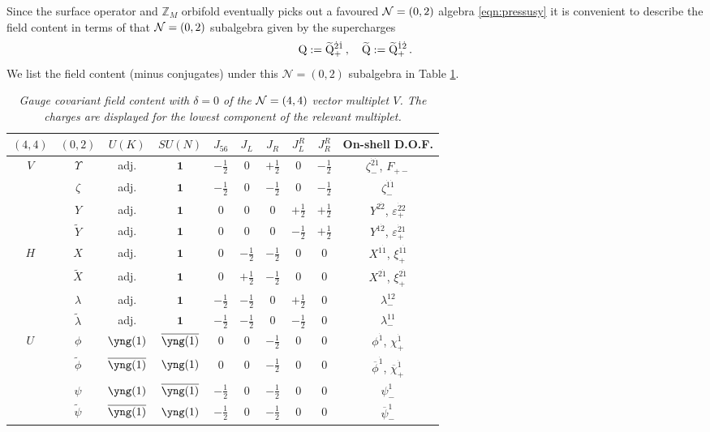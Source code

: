\documentclass[main.tex]{subfiles}
\begin{document}
Since the surface operator and $\mathbb{Z}_M$ orbifold eventually picks out a favoured $\mathcal{N}=(0,2)$ algebra \eqref{eqn:pressusy} it is convenient to describe the field content in terms of that $\mathcal{N}=(0,2)$ subalgebra given by the supercharges 
\begin{equation}\label{eqn:20algebra}
\mathrm{Q}:=\widetilde{\mathrm{Q}}^{\dot2\dot1}_{+}\,,\quad\widetilde{\mathrm{Q}}:=\widetilde{\mathrm{Q}}^{\dot1\dot2}_{+}\,.
\end{equation}
We list the field content (minus conjugates) under this $\mathcal{N}=(0,2)$ subalgebra in Table \ref{tab:d1d5}.
\begin{table}
\centering
 \begin{tabular}{|c|c|c|c|c|c|c|c|c|c|} 
 \hline
$(4,4)$ & $(0,2)$ & $U(K)$ & $SU(N)$& $J_{56}$&$J_L$&$J_R$&$J_L^R$&$J_R^R$ &On-shell D.O.F.\\\hline\hline
\multirow{ 4}{*}{$V$}&$\Upsilon$ &adj. & $\mathbf{1}$&$-\frac{1}{2}$&$0$&$+\frac{1}{2}$&$0$&$-\frac{1}{2}$& $\zeta^{\dot2\dot1}_{-}$, $F_{+-}$\\\cline{2-10}
&$\zeta$ &adj. & $\mathbf{1}$&$-\frac{1}{2}$&$0$&$-\frac{1}{2}$&$0$&$-\frac{1}{2}$& $\zeta^{\dot1\dot1}_{-}$\\\cline{2-10}
&$Y$ &adj. & $\mathbf{1}$&$0$&$0$&$0$&$+\frac{1}{2}$&$+\frac{1}{2}$& $Y^{2\dot2}$, $\varepsilon_{+}^{\dot2 2}$\\\cline{2-10}
&$\widetilde{Y}$ &adj. & $\mathbf{1}$&$0$&$0$&$0$&$-\frac{1}{2}$&$+\frac{1}{2}$& $Y^{1\dot2}$, $\varepsilon_{+}^{\dot2 1}$\\\hline
\multirow{ 4}{*}{$H$}&$X$ &adj. & $\mathbf{1}$&$0$&$-\frac{1}{2}$&$-\frac{1}{2}$&$0$&$0$& $X^{1\dot1}$, $\xi_{+}^{1\dot1}$\\\cline{2-10}
&$\widetilde{X}$ &adj. & $\mathbf{1}$&$0$&$+\frac{1}{2}$&$-\frac{1}{2}$&$0$&$0$& $X^{2\dot1}$, $\xi_{+}^{2\dot1}$\\\cline{2-10}
&$\lambda$ &adj. & $\mathbf{1}$&$-\frac{1}{2}$&$-\frac{1}{2}$&$0$&$+\frac{1}{2}$&$0$& $\lambda_-^{12}$\\\cline{2-10}
&$\widetilde{\lambda}$ &adj. & $\mathbf{1}$&$-\frac{1}{2}$&$-\frac{1}{2}$&$0$&$-\frac{1}{2}$&$0$& $\lambda_-^{11}$\\\hline
\multirow{ 4}{*}{$U$}&$\phi$ &\tiny$\yng(1)$& \tiny$\overline{\yng(1)}$&$0$&$0$&$-\frac{1}{2}$&$0$&$0$& $\phi^{\dot1}$, $\chi_{+}^{\dot1}$\\\cline{2-10}
&$\widetilde{\phi}$ &\tiny$\overline{\yng(1)}$& \tiny$\yng(1)$&$0$&$0$&$-\frac{1}{2}$&$0$&$0$& $\overline{\phi}^{\dot1}$, $\overline{\chi}_{+}^{\dot1}$\\\cline{2-10}
&$\psi$ &\tiny$\yng(1)$& \tiny$\overline{\yng(1)}$&$-\frac{1}{2}$&$0$&$-\frac{1}{2}$&$0$&$0$& $\psi^1_{-}$\\\cline{2-10}
&$\widetilde{\psi}$ &\tiny$\overline{\yng(1)}$& \tiny$\yng(1)$&$-\frac{1}{2}$&$0$&$-\frac{1}{2}$&$0$&$0$& $\overline{\psi}_{-}^{1}$\\\hline
\end{tabular}
\caption{\it Gauge covariant field content with $\delta=0$ of the $\mathcal{N}=(4,4)$ vector multiplet $V$. The charges are displayed for the lowest component of the relevant multiplet.}
 \label{tab:d1d5}
\end{table}
\end{document}
